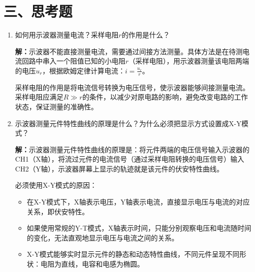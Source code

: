\documentclass[12pt,a4paper]{article}
\begin{document}
\section*{三、思考题}
\begin{enumerate}
    \item 如何用示波器测量电流？采样电阻$r$的作用是什么？
    
    \textbf{解：}示波器不能直接测量电流，需要通过间接方法测量。具体方法是在待测电流回路中串入一个阻值已知的小电阻$r$（采样电阻），用示波器测量该电阻两端的电压$u_r$，根据欧姆定律计算电流：$i = \frac{u_r}{r}$。
    
    采样电阻的作用是将电流信号转换为电压信号，使示波器能够间接测量电流。采样电阻应满足$R \gg r$的条件，以减少对原电路的影响，避免改变电路的工作状态，保证测量的准确性。
    
    \vspace{1cm}
    
    \item 示波器测量元件特性曲线的原理是什么？为什么必须把显示方式设置成X-Y模式？
    
    \textbf{解：}示波器测量元件特性曲线的原理是：将元件两端的电压信号输入示波器的CH1（X轴），将流过元件的电流信号（通过采样电阻转换的电压信号）输入CH2（Y轴），示波器屏幕上显示的轨迹就是该元件的伏安特性曲线。
    
    必须使用X-Y模式的原因：
    \begin{itemize}
        \item 在X-Y模式下，X轴表示电压，Y轴表示电流，直接显示电压与电流的对应关系，即伏安特性。
        \item 如果使用常规的Y-T模式，X轴表示时间，只能分别观察电压和电流随时间的变化，无法直观地显示电压与电流之间的关系。
        \item X-Y模式能够实时显示元件的静态和动态特性曲线，不同元件呈现不同形状：电阻为直线，电容和电感为椭圆。
    \end{itemize}
    
    \vspace{1cm}
    
    
    
\end{enumerate}
\end{document}
